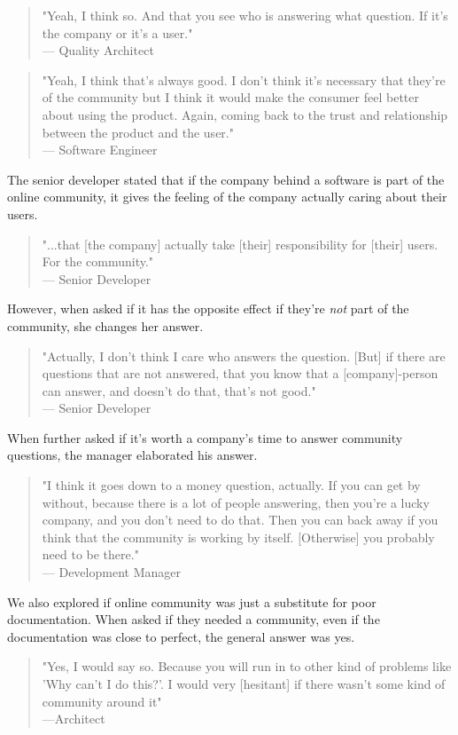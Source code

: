 \documentclass{cslthse-msc}
\begin{document}
    \begin{quote}
        "Yeah, I think so. And that you see who is answering what question. If it's the company or it's a user."\\--- Quality Architect
    \end{quote}
    \begin{quote}
        "Yeah, I think that's always good. I don't think it's necessary that they're of the community but I think it would make the consumer feel better about using the product. Again, coming back to the trust and relationship between the product and the user."\\--- Software Engineer
    \end{quote}
    The senior developer stated that if the company behind a software is part of the online community, it gives the feeling of the company actually caring about their users.
    \begin{quote}
        "...that [the company] actually take [their] responsibility for [their] users. For the community." \\--- Senior Developer
    \end{quote}
    However, when asked if it has the opposite effect if they're \textit{not} part of the community, she changes her answer.
    \begin{quote}
        "Actually, I don't think I care who answers the question. [But] if there are questions that are not answered, that you know that a [company]-person can answer, and doesn't do that, that's not good."\\--- Senior Developer
    \end{quote}
    When further asked if it's worth a company's time to answer community questions, the manager elaborated his answer.
    \begin{quote}
        "I think it goes down to a money question, actually. If you can get by without, because there is a lot of people answering, then  you're a lucky company, and you don't need to do that. Then you can back away if you think that the community is working by itself. [Otherwise] you probably need to be there."\\--- Development Manager
    \end{quote}
    We also explored if online community was just a substitute for poor documentation. When asked if they needed a community, even if the documentation was close to perfect, the general answer was yes.
    \begin{quote}
        "Yes, I would say so. Because you will run in to other kind of problems like 'Why can't I do this?'. I would very [hesitant] if there wasn't some kind of community around it"\\---Architect
    \end{quote}
\end{document}
